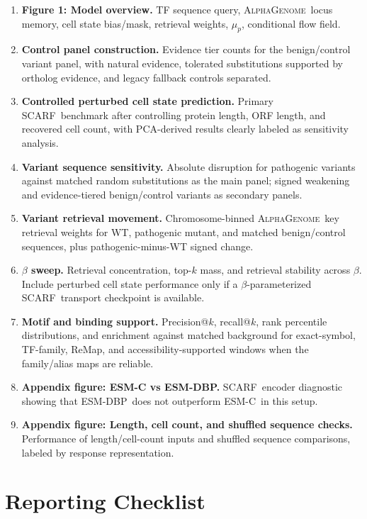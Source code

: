 \documentclass{article}
\newcommand{\ag}{\textsc{AlphaGenome}}
\newcommand{\scarf}{\textsc{SCARF}}
\newcommand{\esm}{\textsc{ESM-C}}
\newcommand{\esmdbp}{\textsc{ESM-DBP}}
\begin{document}
\begin{enumerate}
    \item \textbf{Figure 1: Model overview.} TF sequence query, \ag\ locus memory, cell state bias/mask, retrieval weights, \(\mu_p\), conditional flow field.
    \item \textbf{Control panel construction.} Evidence tier counts for the benign/control variant panel, with natural evidence, tolerated substitutions supported by ortholog evidence, and legacy fallback controls separated.
    \item \textbf{Controlled perturbed cell state prediction.} Primary \scarf\ benchmark after controlling protein length, ORF length, and recovered cell count, with PCA-derived results clearly labeled as sensitivity analysis.
    \item \textbf{Variant sequence sensitivity.} Absolute disruption for pathogenic variants against matched random substitutions as the main panel; signed weakening and evidence-tiered benign/control variants as secondary panels.
    \item \textbf{Variant retrieval movement.} Chromosome-binned \ag\ key retrieval weights for WT, pathogenic mutant, and matched benign/control sequences, plus pathogenic-minus-WT signed change.
    \item \textbf{\(\beta\) sweep.} Retrieval concentration, top-\(k\) mass, and retrieval stability across \(\beta\). Include perturbed cell state performance only if a \(\beta\)-parameterized \scarf\ transport checkpoint is available.
    \item \textbf{Motif and binding support.} Precision@\(k\), recall@\(k\), rank percentile distributions, and enrichment against matched background for exact-symbol, TF-family, ReMap, and accessibility-supported windows when the family/alias maps are reliable.
    \item \textbf{Appendix figure: ESM-C vs ESM-DBP.} \scarf\ encoder diagnostic showing that \esmdbp\ does not outperform \esm\ in this setup.
    \item \textbf{Appendix figure: Length, cell count, and shuffled sequence checks.} Performance of length/cell-count inputs and shuffled sequence comparisons, labeled by response representation.
\end{enumerate}

\section{Reporting Checklist}
\label{app:reporting_checklist}
\end{document}
